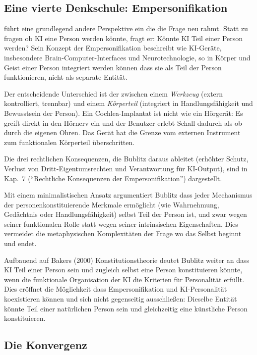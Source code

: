 \documentclass[acmlarge, noacm]{acmart}
\begin{document}
\subsection{Eine vierte Denkschule: Empersonifikation}

\citet{bublitz2024} führt eine grundlegend andere Perspektive ein die die Frage neu rahmt. Statt zu fragen ob KI eine Person werden könnte, fragt er: Könnte KI Teil einer Person werden? Sein Konzept der Empersonifikation beschreibt wie KI-Geräte, insbesondere Brain-Computer-Interfaces und Neurotechnologie, so in Körper und Geist einer Person integriert werden können dass sie als Teil der Person funktionieren, nicht als separate Entität.

Der entscheidende Unterschied ist der zwischen einem \textit{Werkzeug} (extern kontrolliert, trennbar) und einem \textit{Körperteil} (integriert in Handlungsfähigkeit und Bewusstsein der Person). Ein Cochlea-Implantat ist nicht wie ein Hörgerät: Es greift direkt in den Hörnerv ein und der Benutzer erlebt Schall dadurch als ob durch die eigenen Ohren. Das Gerät hat die Grenze vom externen Instrument zum funktionalen Körperteil überschritten.

Die drei rechtlichen Konsequenzen, die Bublitz daraus ableitet (erhöhter Schutz, Verlust von Dritt-Eigentumsrechten und Verantwortung für KI-Output), sind in Kap.~7 (``Rechtliche Konsequenzen der Empersonifikation'') dargestellt.

Mit einem minimalistischen Ansatz argumentiert Bublitz dass jeder Mechanismus der personenkonstituierende Merkmale ermöglicht (wie Wahrnehmung, Gedächtnis oder Handlungsfähigkeit) selbst Teil der Person ist, und zwar wegen seiner funktionalen Rolle statt wegen seiner intrinsischen Eigenschaften. Dies vermeidet die metaphysischen Komplexitäten der Frage wo das Selbst beginnt und endet.

Aufbauend auf Bakers (2000) Konstitutionstheorie deutet Bublitz weiter an dass KI Teil einer Person sein und zugleich selbst eine Person konstituieren könnte, wenn die funktionale Organisation der KI die Kriterien für Personalität erfüllt. Dies eröffnet die Möglichkeit dass Empersonifikation und KI-Personalität koexistieren können und sich nicht gegenseitig ausschließen: Dieselbe Entität könnte Teil einer natürlichen Person sein und gleichzeitig eine künstliche Person konstituieren.

\subsection{Die Konvergenz}
\end{document}
